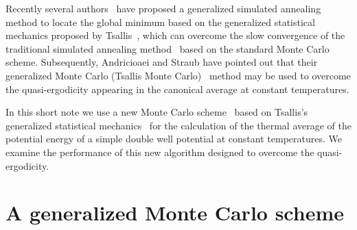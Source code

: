 Recently several authors~\cite{Pe,TS,AS1} have proposed a 
generalized simulated annealing method to locate the global 
minimum based on the generalized statistical mechanics 
proposed by Tsallis~\cite{Ts}, which can overcome the slow 
convergence of the traditional simulated annealing
method~\cite{KGV} based on the standard Monte Carlo scheme. 
Subsequently, Andricioaei and Straub have pointed out that 
their generalized Monte Carlo (Tsallis Monte Carlo)~\cite{AS2} 
method may be used to overcome the quasi-ergodicity appearing 
in the canonical average at constant temperatures.

In this short note we use a new Monte Carlo scheme~\cite{AS2,AS3,SA} 
based on Tsallis's generalized statistical mechanics~\cite{TS} 
for the calculation of the thermal average of the potential energy 
of a simple double well potential at constant temperatures.
We examine the performance of this new algorithm designed to 
overcome the quasi-ergodicity.  

\section{A generalized Monte Carlo scheme} 


